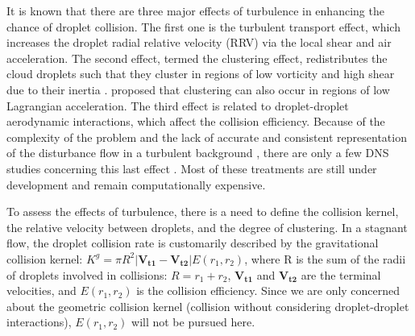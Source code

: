 It is known that there are three major effects of turbulence in enhancing the chance of droplet collision. The first one is the turbulent transport effect, which increases the droplet radial relative velocity (RRV) via the local shear and air acceleration. The second effect, termed the clustering effect, redistributes the cloud droplets such that they cluster in regions of low vorticity and high shear due to their inertia  \citep{Maxey1987, Wang1993, Reade2000, Vaillancourt2002}. \citet{Chen2006} proposed that clustering can also occur in regions of low Lagrangian acceleration.  The third effect is related to droplet-droplet aerodynamic interactions, which affect the collision efficiency. Because of the complexity of the problem and the lack of accurate and consistent representation of the disturbance flow in a turbulent background \citep{Rosa2011}, there are only a few DNS studies concerning this last effect \citep{Wang2005a, Ayala2007, Ayala2014}. Most of these treatments are still under development and remain computationally expensive.

To assess the effects of turbulence, there is a need to define the collision kernel, the relative velocity between droplets, and the degree of clustering. In a stagnant flow, the droplet collision rate is customarily described by the gravitational collision kernel: $K^g=\pi R^2|\mathbf{V_{t1}}-\mathbf{V_{t2}}|E(r_1, r_2)$, where R is the sum of the radii of droplets involved in collisions: $R= r_1+r_2$, $\mathbf{V_{t1}}$ and $\mathbf{V_{t2}}$ are the terminal velocities, and $E(r_1, r_2) $ is the collision efficiency. Since we are only concerned about the geometric collision kernel (collision without considering droplet-droplet interactions), $E(r_1, r_2) $ will not be pursued here. 


